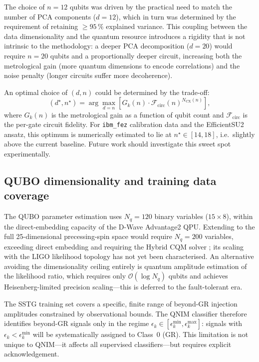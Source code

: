 \documentclass[11pt,a4paper, english]{book}
\theoremstyle{plain}
\theoremstyle{definition}
\numberwithin{equation}{chapter}
\numberwithin{figure}{chapter}
\numberwithin{table}{chapter}
\begin{document}
The choice of $n = 12$ qubits was driven by the practical need to match
the number of PCA components ($d = 12$), which in turn was determined by
the requirement of retaining $\geq 95\,\%$ explained variance.  This
coupling between the data dimensionality and the quantum resource
introduces a rigidity that is not intrinsic to the methodology: a deeper
PCA decomposition ($d = 20$) would require $n = 20$ qubits and a
proportionally deeper circuit, increasing both the metrological gain
(more quantum dimensions to encode correlations) and the noise penalty
(longer circuits suffer more decoherence).

An optimal choice of $(d, n)$ could be determined by the trade-off:
\begin{equation}
  \label{eq:dn_tradeoff}
  (d^\star, n^\star) = \arg\max_{d=n}
    \left[ G_k(n) \cdot \mathcal{F}_\mathrm{circ}(n)^{N_\mathrm{CX}(n)} \right],
\end{equation}
where $G_k(n)$ is the metrological gain as a function of qubit count
and $\mathcal{F}_\mathrm{circ}$ is the per-gate circuit fidelity.  For
\texttt{ibm\_fez} calibration data and the EfficientSU2 ansatz, this
optimum is numerically estimated to lie at $n^\star \in [14, 18]$, i.e.\
slightly above the current baseline.  Future work should investigate this
sweet spot experimentally.

\subsection{QUBO dimensionality and training data coverage}
\label{subsec:disc-qubo-coverage}

The QUBO parameter estimation uses $N_q = 120$ binary variables
($15 \times 8$), within the direct-embedding capacity of the D-Wave
Advantage2 QPU\@. Extending to the full 25-dimensional precessing-spin
space would require $N_q = 200$ variables, exceeding direct embedding and
requiring the Hybrid CQM solver \cite{DWave_2022_hybrid}; its scaling
with the LIGO likelihood topology has not yet been characterised.  An
alternative avoiding the dimensionality ceiling entirely is quantum
amplitude estimation of the likelihood ratio, which requires only
$\mathcal{O}(\log N_q)$ qubits and achieves Heisenberg-limited precision
scaling---this is deferred to the fault-tolerant era.

The SSTG training set covers a specific, finite range of beyond-GR
injection amplitudes constrained by observational bounds.  The QNIM
classifier therefore identifies beyond-GR signals only in the regime
$\epsilon_k \in [\epsilon_k^\mathrm{min}, \epsilon_k^\mathrm{max}]$:
signals with $\epsilon_k < \epsilon_k^\mathrm{min}$ will be
systematically assigned to Class~0 (GR).  This limitation is not unique
to QNIM---it affects all supervised classifiers---but requires explicit
acknowledgement.
\end{document}
